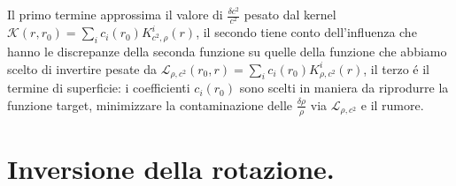 \documentclass[../main.tex]{subfiles}
\begin{document}
Il primo termine approssima il valore di $\frac{\delta c^2}{c^2}$ pesato dal kernel $\mathcal{K}(r,r_0)=\sum_ic_i(r_0)K_{c^2,\rho}^i(r)$, il secondo tiene conto dell'influenza che hanno le discrepanze della seconda funzione su quelle della funzione che abbiamo scelto di invertire pesate da $\mathcal{L}_{\rho,c^2}(r_0,r)=\sum_ic_i(r_0)K_{\rho,c^2}^i(r)$, il terzo \'e il termine di superficie: i coefficienti $c_i(r_0)$ sono scelti in maniera da riprodurre la funzione target, minimizzare la contaminazione delle $\frac{\delta \rho}{\rho}$ via $\mathcal{L}_{\rho,c^2}$ e il rumore.

\begin{comment}
\section{risultati inversione}
[reminder: EOS dependence:LInantiabasu07]
[reminder: errori: sperimentali/numerici/modello per inversione $(\rho,Y)$, $(\rho,\Gamma_1)$]
[reminder: errori: sperimentali/numerici/modello per inversione $(\rho,c^2)$]
\begin{wraptable}{r}{5.5cm}
\begin{tabular}{|cccc|}
&$\Delta_{exp}$&$\Delta_{num}$&$\Delta_{mod}$\\
$\frac{\delta c}{c}$&$0.02\%$&&\\
$\frac{\delta\rho}{\rho}$&&&\\
\end{tabular}
\end{wraptable}
\end{comment}

\section{Inversione della rotazione.}

\end{document}
